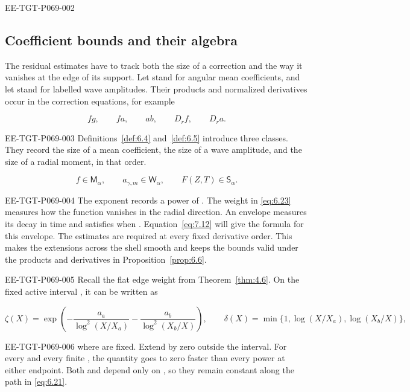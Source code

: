 \begin{EESegment}{EE-TGT-P069-002}
\subsection{Coefficient bounds and their algebra}\label{sec:6.4}

The residual estimates have to track both the size of a correction and the way it vanishes at the edge of its support. Let  stand for angular mean coefficients, and let  stand for labelled wave amplitudes. Their products and normalized derivatives occur in the correction equations, for example
\end{EESegment}
\[
  fg,\qquad fa,\qquad ab,\qquad D_rf,\qquad D_ra.
\]
\begin{EESegment}{EE-TGT-P069-003}
Definitions~\ref{def:6.4} and~\ref{def:6.5} introduce three classes. They record the size of a mean coefficient, the size of a wave amplitude, and the size of a radial moment, in that order.
\end{EESegment}
\[
  f\in\mathsf M_\alpha,
  \qquad a_{\gamma,m}\in\mathsf W_\alpha,
  \qquad F(Z,T)\in\mathsf S_\alpha.
\]
\begin{EESegment}{EE-TGT-P069-004}
The exponent  records a power of . The weight  in \eqref{eq:6.23} measures how the function vanishes in the radial direction. An envelope  measures its decay in time and satisfies  when . Equation~\eqref{eq:7.12} will give the formula for this envelope. The estimates are required at every fixed derivative order. This makes the extensions across the shell smooth and keeps the bounds valid under the products and derivatives in Proposition~\ref{prop:6.6}.
\end{EESegment}

\begin{EESegment}{EE-TGT-P069-005}
Recall the flat edge weight from Theorem~\ref{thm:4.6}. On the fixed active interval , it can be written as
\end{EESegment}
\begin{equation}
  \zeta(X)=\exp\!\left(
    -\frac{a_a}{\log^2(X/X_a)}-\frac{a_b}{\log^2(X_b/X)}
  \right),
  \qquad
  \delta(X)=\min\{1,\log(X/X_a),\log(X_b/X)\},
  \tag{6.23}\label{eq:6.23}
\end{equation}
\begin{EESegment}{EE-TGT-P069-006}
where  are fixed. Extend  by zero outside the interval. For every  and every finite , the quantity  goes to zero faster than every power at either endpoint. Both  and  depend only on , so they remain constant along the path in \eqref{eq:6.21}.
\end{EESegment}

